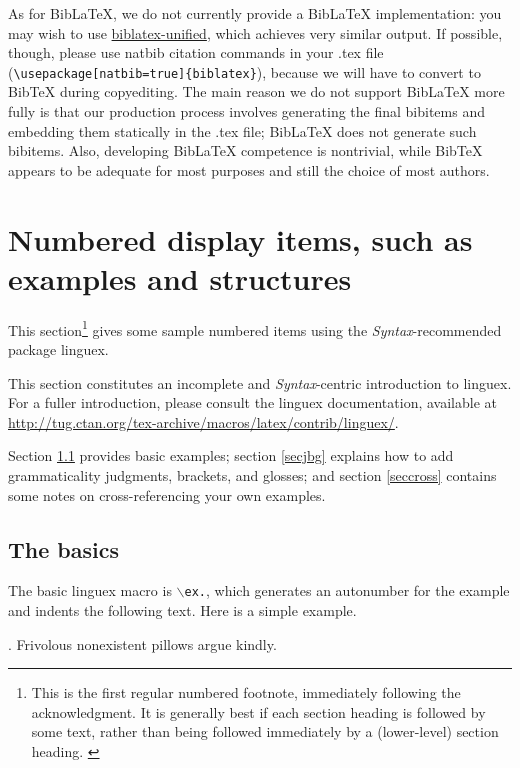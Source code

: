 \documentclass[letterpaper,12pt, twoside]{article}
\begin{document}
As for BibLaTeX, we do not currently provide a BibLaTeX implementation: you may wish to use \href{https://ctan.org/pkg/biblatex-unified}{biblatex-unified}, which achieves very similar output. If possible, though, please use  natbib citation commands in your .tex file (\verb|\usepackage[natbib=true]{biblatex}|), because we will have to convert to BibTeX during copyediting. The main reason we do not support BibLaTeX more fully is that our production process involves generating the final bibitems and embedding them statically in the .tex file; BibLaTeX does not generate such bibitems. Also, developing BibLaTeX competence is nontrivial, while BibTeX appears to be adequate for most purposes and still the choice of most authors.



\section{Numbered display items, such as examples and structures}\label{secexs}
This section\footnote{This is the first regular numbered footnote, immediately following the acknowledgment. It is generally best if each section heading is followed by some text, rather than being followed immediately by a (lower-level) section heading. \label{padding}}   gives some sample numbered items using the \emph{Syntax}-recommended package {linguex}. 

This section constitutes an incomplete and \emph{Syntax}-centric introduction to {linguex}. For a fuller introduction, please consult the {linguex} documentation, available at {\href{http://tug.ctan.org/tex-archive/macros/latex/contrib/linguex/}{http://tug.ctan.org/\linebreak[1]tex-archive/macros/latex/contrib/linguex/}}.

Section \ref{secbasics} provides basic examples; section \ref{secjbg} explains how to add grammaticality judgments, brackets, and glosses; and section \ref{seccross} contains some notes on cross-referencing your own examples.

\subsection{The basics}\label{secbasics}
The basic {linguex} macro is \texttt{$\backslash$ex.}, which generates an autonumber for the example and indents the following text. Here is a simple example.

\ex. Frivolous nonexistent pillows argue kindly.
\end{document}
